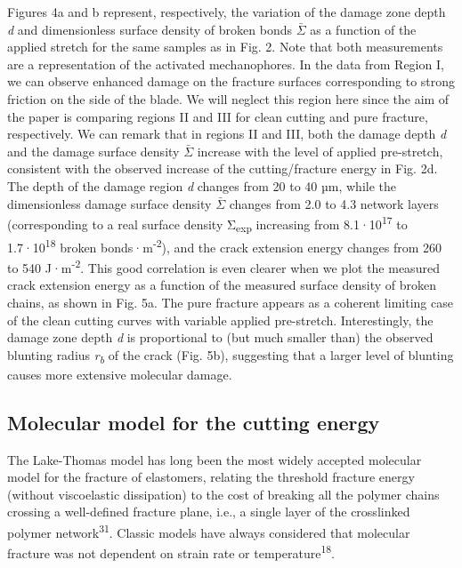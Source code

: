 \documentclass{article}
\begin{document}
Figures 4a and b represent, respectively, the variation of the damage zone depth \emph{d} and dimensionless surface density of broken bonds $\bar{\Sigma}$ as a function of the applied stretch for the same samples as in Fig. 2. Note that both measurements are a representation of the activated mechanophores. In the data from Region I, we can observe enhanced damage on the fracture surfaces corresponding to strong friction on the side of the blade. We will neglect this region here since the aim of the paper is comparing regions II and III for clean cutting and pure fracture, respectively. We can remark that in regions II and III, both the damage depth \emph{d} and the damage surface density $\bar{\Sigma}$ increase with the level of applied pre-stretch, consistent with the observed increase of the cutting/fracture energy in Fig. 2d. The depth of the damage region \emph{d} changes from 20 to 40 µm, while the dimensionless damage surface density $\bar{\Sigma}$ changes from 2.0 to 4.3 network layers (corresponding to a real surface density Σ\textsubscript{exp} increasing from 8.1·10\textsuperscript{17} to 1.7·10\textsuperscript{18} broken bonds·m\textsuperscript{-2}), and the crack extension energy changes from 260 to 540 J·m\textsuperscript{-2}. This good correlation is even clearer when we plot the measured crack extension energy as a function of the measured surface density of broken chains, as shown in Fig. 5a. The pure fracture appears as a coherent limiting case of the clean cutting curves with variable applied pre-stretch. Interestingly, the damage zone depth \emph{d} is proportional to (but much smaller than) the observed blunting radius \emph{r}\textsubscript{\emph{b}} of the crack (Fig. 5b), suggesting that a larger level of blunting causes more extensive molecular damage.

\subsection*{Molecular model for the cutting energy}

The Lake-Thomas model has long been the most widely accepted molecular model for the fracture of elastomers, relating the threshold fracture energy (without viscoelastic dissipation) to the cost of breaking all the polymer chains crossing a well-defined fracture plane, i.e., a single layer of the crosslinked polymer network\textsuperscript{31}. Classic models have always considered that molecular fracture was not dependent on strain rate or temperature\textsuperscript{18}.
\end{document}
